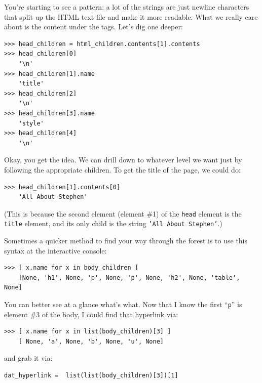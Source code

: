 You're starting to see a pattern: a lot of the strings are just newline
characters that split up the HTML text file and make it more readable. What we
really care about is the content under the tags. Let's dig one deeper:

\vspace{-.1in}
\begin{Verbatim}[fontsize=\footnotesize,samepage=true,frame=single]
>>> head_children = html_children.contents[1].contents
>>> head_children[0]
    '\n'
>>> head_children[1].name
    'title'
>>> head_children[2]
    '\n'
>>> head_children[3].name
    'style'
>>> head_children[4]
    '\n'
\end{Verbatim}

    Okay, you get the idea. We can drill down to whatever level we want just
by following the appropriate children. To get the title of the page, we could
do:

\begin{Verbatim}[fontsize=\footnotesize,samepage=true,frame=single]
>>> head_children[1].contents[0]
    'All About Stephen'
\end{Verbatim}

(This is because the second element (element \#1) of the \texttt{head} element
is the \texttt{title} element, and its only child is the string \texttt{'All
About Stephen'}.)

Sometimes a quicker method to find your way through the forest is to use this
syntax at the interactive console:

\begin{Verbatim}[fontsize=\footnotesize,samepage=true,frame=single]
>>> [ x.name for x in body_children ]
    [None, 'h1', None, 'p', None, 'p', None, 'h2', None, 'table', None]
\end{Verbatim}

You can better see at a glance what's what. Now that I know the first
``\texttt{p}'' is element \#3 of the body, I could find that hyperlink via:

\begin{Verbatim}[fontsize=\footnotesize,samepage=true,frame=single]
>>> [ x.name for x in list(body_children)[3] ]
    [ None, 'a', None, 'b', None, 'u', None]
\end{Verbatim}

and grab it via:

\begin{Verbatim}[fontsize=\footnotesize,samepage=true,frame=single]
dat_hyperlink =  list(list(body_children)[3])[1]
\end{Verbatim}

